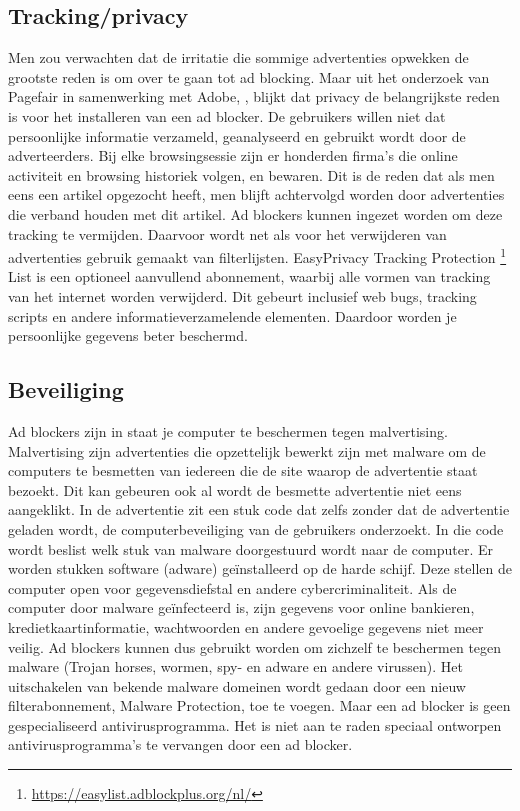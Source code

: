 \documentclass[pdftex,a4paper,12pt,twoside]{report}
\begin{document}
\subsection{Tracking/privacy}
\label{sec tracking/privacy}
Men zou verwachten dat de irritatie die sommige advertenties opwekken de grootste reden is om over te gaan tot ad blocking. Maar uit het onderzoek van Pagefair in samenwerking met Adobe, \cite{PageFair2015}, blijkt dat privacy de belangrijkste reden is voor het installeren van een ad blocker. De gebruikers willen niet dat persoonlijke informatie verzameld, geanalyseerd en gebruikt wordt door de adverteerders. Bij elke browsingsessie zijn er honderden firma's die online activiteit en browsing historiek volgen, en bewaren. Dit is de reden dat als men eens een artikel opgezocht heeft, men blijft achtervolgd worden door advertenties die verband houden met dit artikel. Ad blockers kunnen ingezet worden om deze tracking te vermijden. Daarvoor wordt net als voor het verwijderen van advertenties gebruik gemaakt van filterlijsten. EasyPrivacy Tracking Protection \footnote{\url{https://easylist.adblockplus.org/nl/}} List is een optioneel aanvullend abonnement, waarbij alle vormen van tracking van het internet worden verwijderd. Dit gebeurt inclusief web bugs, tracking scripts en andere informatieverzamelende elementen. Daardoor worden je persoonlijke gegevens beter beschermd.

\subsection{Beveiliging}
\label{sec Beveiliging}
Ad blockers zijn in staat je computer te beschermen tegen malvertising. Malvertising zijn advertenties die opzettelijk bewerkt zijn met malware om de computers te besmetten van iedereen die de site waarop de advertentie staat bezoekt. Dit kan gebeuren ook al wordt de besmette advertentie niet eens aangeklikt. 
In de advertentie zit een stuk code dat zelfs zonder dat de advertentie geladen wordt, de computerbeveiliging van de gebruikers onderzoekt. In die code wordt beslist welk stuk van malware doorgestuurd wordt naar de computer. Er worden stukken software (adware) geïnstalleerd op de harde schijf. Deze stellen de computer open voor gegevensdiefstal en andere cybercriminaliteit. Als de computer door malware geïnfecteerd is, zijn gegevens voor online bankieren, kredietkaartinformatie, wachtwoorden en andere gevoelige gegevens niet meer veilig. 
Ad blockers kunnen dus gebruikt worden om zichzelf te beschermen tegen malware (Trojan horses, wormen, spy- en adware en andere virussen). Het uitschakelen van bekende malware domeinen wordt gedaan door een nieuw filterabonnement, Malware Protection, toe te voegen. Maar een ad blocker is geen gespecialiseerd antivirusprogramma. Het is niet aan te raden speciaal ontworpen antivirusprogramma's te vervangen door een ad blocker. 
\end{document}
